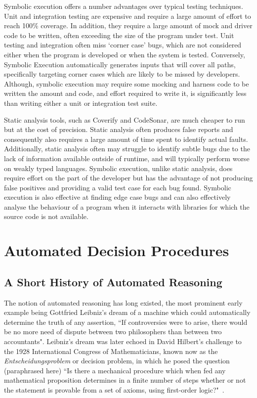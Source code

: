 \documentclass[]{final_report}
\begin{document}
Symbolic execution offers a number advantages over typical testing techniques. Unit and integration testing are expensive and require a large amount of effort to reach 100\% coverage. In addition, they require a large amount of mock and driver code to be written, often exceeding the size of the program under test. Unit testing and integration often miss `corner case' bugs, which are not considered either when the program is developed or when the system is tested. Conversely, Symbolic Execution automatically generates inputs that will cover all paths, specifically targeting corner cases which are likely to be missed by developers. Although, symbolic execution may require some mocking and harness code to be written the amount and code, and effort required to write it, is significantly less than writing either a unit or integration test suite.

Static analysis tools, such as Coverify and CodeSonar, are much cheaper to run but at the cost of precision. Static analysis often produces false reports and consequently also requires a large amount of time spent to identify actual faults. Additionally, static analysis often may struggle to identify subtle bugs due to the lack of information available outside of runtime, and will typically perform worse on weakly typed languages. Symbolic execution, unlike static analysis, does require effort on the part of the developer but has the advantage of not producing false positives and providing a valid test case for each bug found. Symbolic execution is also effective at finding edge case bugs and can also effectively analyse the behaviour of a program when it interacts with libraries for which the source code is not available.

\chapter{Automated Decision Procedures}

\section{A Short History of Automated Reasoning}
The notion of automated reasoning has long existed, the most prominent early example being Gottfried Leibniz's dream of a machine which could automatically determine the truth of any assertion, ``If controversies were to arise, there would be no more need of dispute between two philosophers than between two accountants". Leibniz's dream was later echoed in David Hilbert's challenge to the 1928 International Congress of Mathematicians, known now as the \textit{Entscheidungsproblem} or decision problem, in which he posed the question (paraphrased here) ``Is there a mechanical procedure which when fed any mathematical proposition determines in a finite number of steps whether or not the statement is provable from a set of axioms, using first-order logic?"~\cite{smtwheredowegofromhere, automatedreasoningbooklet2004}.
\end{document}

